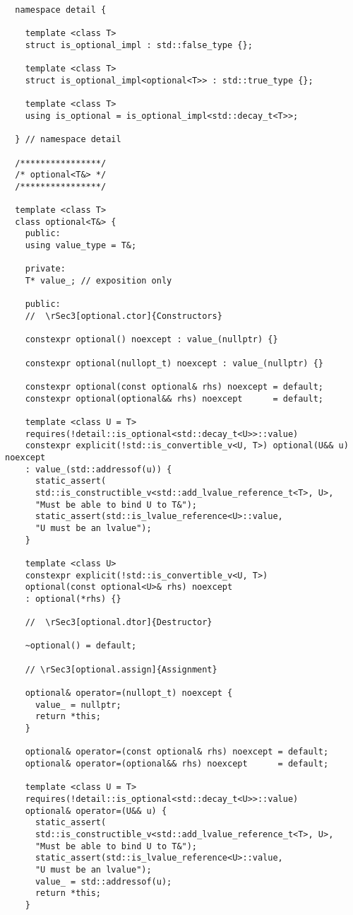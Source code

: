 \documentclass[a4paper,10pt,oneside,openany,final,article]{memoir}
\begin{document}
\begin{verbatim}
  namespace detail {

    template <class T>
    struct is_optional_impl : std::false_type {};

    template <class T>
    struct is_optional_impl<optional<T>> : std::true_type {};

    template <class T>
    using is_optional = is_optional_impl<std::decay_t<T>>;

  } // namespace detail

  /****************/
  /* optional<T&> */
  /****************/

  template <class T>
  class optional<T&> {
    public:
    using value_type = T&;

    private:
    T* value_; // exposition only

    public:
    //  \rSec3[optional.ctor]{Constructors}

    constexpr optional() noexcept : value_(nullptr) {}

    constexpr optional(nullopt_t) noexcept : value_(nullptr) {}

    constexpr optional(const optional& rhs) noexcept = default;
    constexpr optional(optional&& rhs) noexcept      = default;

    template <class U = T>
    requires(!detail::is_optional<std::decay_t<U>>::value)
    constexpr explicit(!std::is_convertible_v<U, T>) optional(U&& u) noexcept
    : value_(std::addressof(u)) {
      static_assert(
      std::is_constructible_v<std::add_lvalue_reference_t<T>, U>,
      "Must be able to bind U to T&");
      static_assert(std::is_lvalue_reference<U>::value,
      "U must be an lvalue");
    }

    template <class U>
    constexpr explicit(!std::is_convertible_v<U, T>)
    optional(const optional<U>& rhs) noexcept
    : optional(*rhs) {}

    //  \rSec3[optional.dtor]{Destructor}

    ~optional() = default;

    // \rSec3[optional.assign]{Assignment}

    optional& operator=(nullopt_t) noexcept {
      value_ = nullptr;
      return *this;
    }

    optional& operator=(const optional& rhs) noexcept = default;
    optional& operator=(optional&& rhs) noexcept      = default;

    template <class U = T>
    requires(!detail::is_optional<std::decay_t<U>>::value)
    optional& operator=(U&& u) {
      static_assert(
      std::is_constructible_v<std::add_lvalue_reference_t<T>, U>,
      "Must be able to bind U to T&");
      static_assert(std::is_lvalue_reference<U>::value,
      "U must be an lvalue");
      value_ = std::addressof(u);
      return *this;
    }


\end{verbatim}
\end{document}
